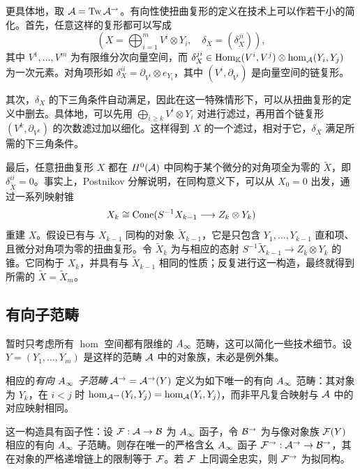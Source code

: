 \begin{note}\label{st:5.19}
更具体地，取 $\mathcal A=\operatorname{Tw}\mathcal A^{\to}$。有向性使扭曲复形的定义在技术上可以作若干小的简化。首先，任意这样的复形都可以写成
\begin{equation}\label{eq:5.31}
\left(X=\bigoplus_{i=1}^mV^i\otimes Y_i,\quad\delta_X=(\delta_X^{ji})\right),
\end{equation}
其中 $V^1,\ldots,V^m$ 为有限维分次向量空间，而 $\delta_X^{ji}\in\operatorname{Hom}_{\mathbb K}(V^i,V^j)\otimes\hom_{\mathcal A}(Y_i,Y_j)$ 为一次元素。对角项形如 $\delta_X^{ii}=\partial_{V^i}\otimes e_{Y_i}$，其中 $(V^i,\partial_{V^i})$ 是向量空间的链复形。

其次，$\delta_X$ 的下三角条件自动满足，因此在这一特殊情形下，可以从扭曲复形的定义中删去。具体地，可以先用 $\bigoplus_{i\geq k}V^i\otimes Y_i$ 对进行滤过，再用首个链复形 $(V^k,\partial_{V^k})$ 的次数滤过加以细化。这样得到 $X$ 的一个滤过，相对于它，$\delta_X$ 满足所需的下三角条件。

最后，任意扭曲复形 $X$ 都在 $H^0(\mathcal A)$ 中同构于某个微分的对角项全为零的 $\widetilde X$，即 $\delta_{\widetilde X}^{ii}=0$。事实上，Postnikov 分解说明，在同构意义下，可以从 $X_0=0$ 出发，通过一系列映射锥
\begin{equation}\label{eq:5.32}
X_k\cong\operatorname{Cone}(S^{-1}X_{k-1}\longrightarrow Z_k\otimes Y_k)
\end{equation}
重建 $X$。假设已有与 $X_{k-1}$ 同构的对象 $\widetilde X_{k-1}$，它是只包含 $Y_1,\ldots,Y_{k-1}$ 直和项、且微分对角项为零的扭曲复形。令 $\widetilde X_k$ 为与相应的态射 $S^{-1}\widetilde X_{k-1}\to Z_k\otimes Y_k$ 的锥。它同构于 $X_k$，并具有与 $\widetilde X_{k-1}$ 相同的性质；反复进行这一构造，最终就得到所需的 $\widetilde X=\widetilde X_m$。
\end{note}

\subsection{有向子范畴}\label{sec:5n}
暂时只考虑所有 $\hom$ 空间都有限维的 $A_\infty$ 范畴，这可以简化一些技术细节。设 $Y=(Y_1,\ldots,Y_m)$ 是这样的范畴 $\mathcal A$ 中的对象族，未必是例外集。
\begin{definition*}
相应的\emph{有向 $A_\infty$ 子范畴} $\mathcal A^{\to}=\mathcal A^{\to}(Y)$ 定义为如下唯一的有向 $A_\infty$ 范畴：其对象为 $Y_k$，在 $i<j$ 时 $\hom_{\mathcal A^{\to}}(Y_i,Y_j)=\hom_{\mathcal A}(Y_i,Y_j)$，而非平凡复合映射与 $\mathcal A$ 中的对应映射相同。
\end{definition*}
这一构造具有函子性：设 $\mathcal F:\mathcal A\to\mathcal B$ 为 $A_\infty$ 函子，令 $\mathcal B^{\to}$ 为与像对象族 $\mathcal F(Y)$ 相应的有向 $A_\infty$ 子范畴。则存在唯一的严格含幺 $A_\infty$ 函子 $\mathcal F^{\to}:\mathcal A^{\to}\to\mathcal B^{\to}$，其在对象的严格递增链上的限制等于 $\mathcal F$。若 $\mathcal F$ 上同调全忠实，则 $\mathcal F^{\to}$ 为拟同构。

